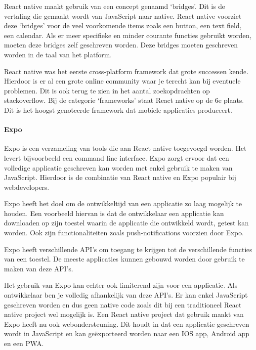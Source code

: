 		React native maakt gebruik van een concept genaamd ‘bridges’. Dit is de vertaling die gemaakt wordt van JavaScript naar native. React native voorziet deze ‘bridges’ voor de veel voorkomende items zoals een button, een text field, een calendar. Als er meer specifieke en minder courante functies gebruikt worden, moeten deze bridges zelf geschreven worden. Deze bridges moeten geschreven worden in de taal van het platform. 
		\autocite{Bartosz2019}
		
		React native was het eerste cross-platform framework dat grote successen kende. Hierdoor is er al een grote online community waar je terecht kan bij eventuele problemen. Dit is ook terug te zien in het aantal zoekopdrachten op stackoverflow. Bij de categorie ‘frameworks’ staat React native op de 6e plaats. Dit is het hoogst genoteerde framework dat mobiele applicaties produceert.
		\autocite{StackOverflow2020}
		
		
		\paragraph{Expo}
			Expo is een verzameling van tools die aan React native toegevoegd worden. Het levert bijvoorbeeld een command line interface. Expo zorgt ervoor dat een volledige applicatie geschreven kan worden met enkel gebruik te maken van JavaScript. Hierdoor is de combinatie van React native en Expo populair bij webdevelopers.
			
			Expo heeft het doel om de ontwikkeltijd van een applicatie zo laag mogelijk te houden. Een voorbeeld hiervan is dat de ontwikkelaar een applicatie kan downloaden op zijn toestel waarin de applicatie die ontwikkeld wordt, getest kan worden. Ook zijn functionaliteiten zoals push-notifications voorzien door Expo.
			
			Expo heeft verschillende API’s om toegang te krijgen tot de verschillende functies van een toestel. De meeste applicaties kunnen gebouwd worden door gebruik te maken van deze API’s. 
			
			Het gebruik van Expo kan echter ook limiterend zijn voor een applicatie. Als ontwikkelaar ben je volledig afhankelijk van deze API’s. Er kan enkel JavaScript geschreven worden en dus geen native code zoals dit bij een traditioneel React native project wel mogelijk is.
			Een React native project dat gebruik maakt van Expo heeft nu ook webondersteuning. Dit houdt in dat een applicatie geschreven wordt in JavaScript en kan geëxporteerd worden naar een IOS app, Android app en een PWA.
			
